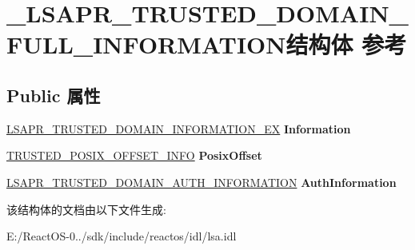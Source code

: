 \hypertarget{struct___l_s_a_p_r___t_r_u_s_t_e_d___d_o_m_a_i_n___f_u_l_l___i_n_f_o_r_m_a_t_i_o_n}{}\section{\+\_\+\+L\+S\+A\+P\+R\+\_\+\+T\+R\+U\+S\+T\+E\+D\+\_\+\+D\+O\+M\+A\+I\+N\+\_\+\+F\+U\+L\+L\+\_\+\+I\+N\+F\+O\+R\+M\+A\+T\+I\+O\+N结构体 参考}
\label{struct___l_s_a_p_r___t_r_u_s_t_e_d___d_o_m_a_i_n___f_u_l_l___i_n_f_o_r_m_a_t_i_o_n}
\subsection*{Public 属性}
\begin{DoxyCompactItemize}
\item 
\mbox{\label{struct___l_s_a_p_r___t_r_u_s_t_e_d___d_o_m_a_i_n___f_u_l_l___i_n_f_o_r_m_a_t_i_o_n_ae418d264476190f8cf6a8f4294b619c9}} 
\hyperlink{struct___l_s_a_p_r___t_r_u_s_t_e_d___d_o_m_a_i_n___i_n_f_o_r_m_a_t_i_o_n___e_x}{L\+S\+A\+P\+R\+\_\+\+T\+R\+U\+S\+T\+E\+D\+\_\+\+D\+O\+M\+A\+I\+N\+\_\+\+I\+N\+F\+O\+R\+M\+A\+T\+I\+O\+N\+\_\+\+EX} {\bfseries Information}
\item 
\mbox{\label{struct___l_s_a_p_r___t_r_u_s_t_e_d___d_o_m_a_i_n___f_u_l_l___i_n_f_o_r_m_a_t_i_o_n_adf6d97318966c5af15c6ac68c1187dbe}} 
\hyperlink{struct___t_r_u_s_t_e_d___p_o_s_i_x___o_f_f_s_e_t___i_n_f_o}{T\+R\+U\+S\+T\+E\+D\+\_\+\+P\+O\+S\+I\+X\+\_\+\+O\+F\+F\+S\+E\+T\+\_\+\+I\+N\+FO} {\bfseries Posix\+Offset}
\item 
\mbox{\label{struct___l_s_a_p_r___t_r_u_s_t_e_d___d_o_m_a_i_n___f_u_l_l___i_n_f_o_r_m_a_t_i_o_n_a78db262e48c59dc011220ad67d5330d4}} 
\hyperlink{struct___l_s_a_p_r___t_r_u_s_t_e_d___d_o_m_a_i_n___a_u_t_h___i_n_f_o_r_m_a_t_i_o_n}{L\+S\+A\+P\+R\+\_\+\+T\+R\+U\+S\+T\+E\+D\+\_\+\+D\+O\+M\+A\+I\+N\+\_\+\+A\+U\+T\+H\+\_\+\+I\+N\+F\+O\+R\+M\+A\+T\+I\+ON} {\bfseries Auth\+Information}
\end{DoxyCompactItemize}


该结构体的文档由以下文件生成\+:\begin{DoxyCompactItemize}
\item 
E\+:/\+React\+O\+S-\/0../sdk/include/reactos/idl/lsa.\+idl\end{DoxyCompactItemize}
